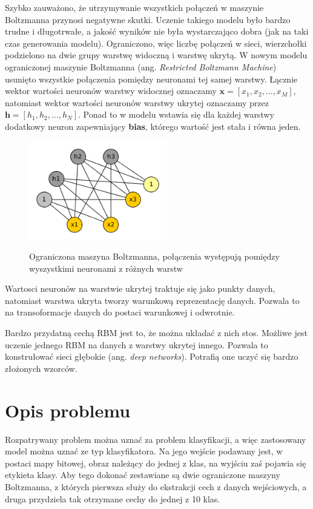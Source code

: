 \documentclass[a4paper,10pt]{report}
\begin{document}
Szybko zauważono, że utrzymywanie wszystkich połączeń w maszynie Boltzmanna przynosi negatywne skutki.
Uczenie takiego modelu było bardzo trudne i długotrwałe, a jakość wyników nie była wystarczająco dobra
(jak na taki czas generowania modelu). Ograniczono, więc liczbę połączeń w sieci, wierzchołki podzielono
na dwie grupy warstwę widoczną i warstwę ukrytą. W nowym modelu ograniczonej maszynie Boltzmanna (ang.
\textit{Restricted Boltzmann Machine}) usunięto wszystkie połączenia pomiędzy neuronami tej samej
warstwy. Łącznie wektor wartości neuronów warstwy widocznej oznaczamy $\mathbf{x}=[x_1, x_2,\dots, x_M]$,
natomiast wektor wartości neuronów warstwy ukrytej oznaczamy przez $\mathbf{h}=[h_1, h_2,\dots, h_N]$.
Ponad to w modelu wstawia się dla każdej warstwy dodatkowy neuron zapewniający \textbf{bias}, którego
wartość jest stała i równa jeden.

\begin{figure}
 \centering
 \includegraphics[width=6cm]{imgs/rbm.png}
 \label{fig:rbm}
\caption{Ograniczona maszyna Boltzmanna, połączenia występują pomiędzy wyszystkimi neuronami z różnych
warstw}
\end{figure} 

Wartosci neuronów na warstwie ukrytej traktuje się jako punkty danych, natomiast warstwa ukryta tworzy
warunkową reprezentację danych. Pozwala to na transoformacje danych do postaci warunkowej i odwrotnie.

Bardzo przydatną cechą RBM jest to, że można układać z nich stos. Możliwe jest uczenie jednego RBM na
danych z warstwy ukrytej innego. Pozwala to konstrułować sieci głębokie (ang. \textit{deep networks}).
Potrafią one uczyć się bardzo złożonych wzorców.

\section{Opis problemu}

Rozpatrywany problem można uznać za problem klasyfikacji, a więc zastosowany model można uznać ze typ
klasyfikatora. Na jego wejście podawany jest, w postaci mapy bitowej, obraz należący do jednej z klas, na
wyjściu zaś pojawia się etykieta klasy. Aby tego dokonać zestawiane są dwie ograniczone maszyny
Boltzmanna, z których pierwsza służy do ekstrakcji cech z danych wejściowych, a druga przydziela tak
otrzymane cechy do jednej z 10 klas.
\end{document}
